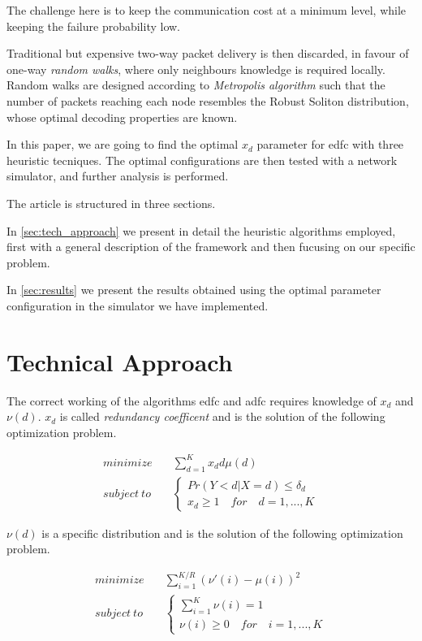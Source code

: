 \documentclass[journal]{IEEEtran}
\begin{document}
The challenge here is to keep the communication cost at a minimum level, while keeping the failure probability low.

Traditional but expensive two-way packet delivery is then discarded, in favour of one-way \emph{random walks}, where only neighbours knowledge is required locally.
Random walks are designed according to \emph{Metropolis algorithm} such that the number of packets reaching each node resembles the Robust Soliton distribution, whose optimal decoding properties are known\cite{Luby}.

In this paper, we are going to find the optimal $x_d$ parameter for \gls{edfc} with three heuristic tecniques.
The optimal configurations are then tested with a network simulator, and further analysis is performed.

The article is structured in three sections.

In \autoref{sec:tech_approach} we present in detail the heuristic algorithms employed, first with a general description of the framework and then fucusing on our specific problem.

In \autoref{sec:results} we present the results obtained using the optimal parameter configuration in the simulator we have implemented.

\section{Technical Approach}
\label{sec:tech_approach}

The correct working of the algorithms \gls{edfc} and \gls{adfc} requires knowledge of $x_d$ and $\nu(d)$. $x_d$ is called \textit{redundancy coefficent} and is the solution of the following optimization problem.

\begin{equation}
	\label{firstproblem}
	\begin{split}
		minimize & \quad \sum_{d=1}^K x_d d \mu (d) \\
		subject \ to & \quad \begin{cases}
			Pr(Y<d|X=d) \leq \delta_d \\
			x_d \geq 1 \quad for \quad d = 1,...,K
		\end{cases}
	\end{split}
\end{equation}

$\nu(d)$ is a specific distribution and is the solution of the following optimization problem.

\begin{equation}
	\label{secondproblem}
	\begin{split}
		minimize & \quad \sum_{i=1}^{K/R}(\nu'(i)-\mu(i))^2 \\
		subject \ to & \quad \begin{cases}
			\sum_{i=1}^K \nu(i) = 1 \\
			\nu(i) \geq 0 \quad for \quad i=1,...,K
		\end{cases}
	\end{split}
\end{equation}
\end{document}
